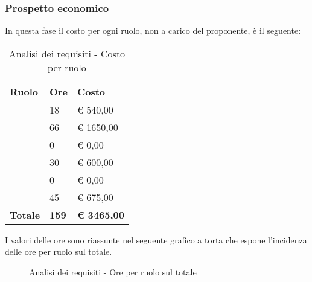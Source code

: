 		\subsubsection{Prospetto economico} %
		\label{ssub:prospetto_economico}
		In questa fase il costo per ogni ruolo, non a carico del proponente\gloss{}, è il seguente: \\
			\begin{table}[!ht]
				\begin{center}
					\begin{tabularx}{0.65\textwidth}{|l|l|X|}
						\hline
						\textbf{Ruolo} & \textbf{Ore} & \textbf{Costo} \\
						\hline
						\roleProjectManager & 18 & \euro{} 540,00 \\
						\hline
						\roleAnalyst & 66 & \euro{} 1650,00 \\
						\hline
						\roleDesigner & 0 & \euro{} 0,00 \\
						\hline
						\roleAdministrator & 30 & \euro{} 600,00 \\
						\hline
						\roleProgrammer & 0 & \euro{} 0,00 \\
						\hline
						\roleVerifier & 45 & \euro{} 675,00 \\
						\hline
						\textbf{Totale} & \textbf{159} & \textbf{\euro{} 3465,00} \\
						\hline
					\end{tabularx}
				\end{center}
			\caption{Analisi dei requisiti - Costo per ruolo}
			\end{table}
			
			\noindent
			I valori delle ore sono riassunte nel seguente grafico a torta che espone l’incidenza delle ore per ruolo sul totale.
			\begin{center}
				\begin{figure}[htbp]
				\vspace{0.8cm}
				\caption{Analisi dei requisiti - Ore per ruolo sul totale}
				\end{figure}
			\end{center}

